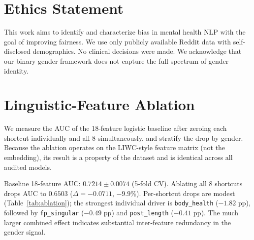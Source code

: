 \documentclass[11pt]{article}
\begin{document}
\section*{Ethics Statement}

This work aims to identify and characterize bias in mental health NLP with the goal of improving fairness.
We use only publicly available Reddit data with self-disclosed demographics.
No clinical decisions were made.
We acknowledge that our binary gender framework does not capture the full spectrum of gender identity.



\appendix

\section{Linguistic-Feature Ablation}
\label{sec:ablation}

We measure the AUC of the 18-feature logistic baseline after zeroing each shortcut individually and all 8 simultaneously, and stratify the drop by gender. Because the ablation operates on the LIWC-style feature matrix (not the embedding), its result is a property of the dataset and is identical across all audited models.

Baseline 18-feature AUC: $0.7214 \pm 0.0074$ (5-fold CV).
Ablating all 8 shortcuts drops AUC to $0.6503$ ($\Delta = -0.0711$, $-9.9\%$). Per-shortcut drops are modest (Table~\ref{tab:ablation}); the strongest individual driver is \texttt{body\_health} ($-1.82$ pp), followed by \texttt{fp\_singular} ($-0.49$ pp) and \texttt{post\_length} ($-0.41$ pp). The much larger combined effect indicates substantial inter-feature redundancy in the gender signal.
\end{document}
